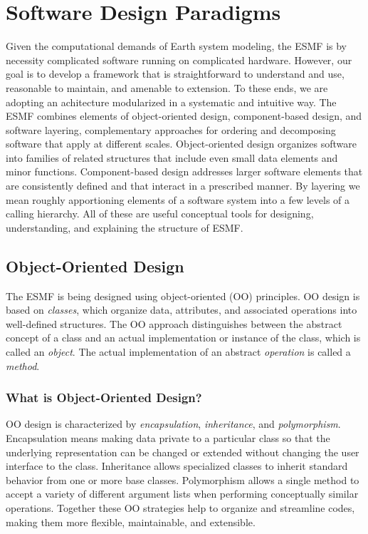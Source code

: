 \section{Software Design Paradigms}
\label{sec:strategies}

Given the computational demands of Earth system modeling, the ESMF is by 
necessity complicated software running on complicated hardware.  However,
our goal is to develop a framework that is straightforward to understand and 
use, reasonable to maintain, and amenable to extension.  
To these ends, we are adopting an achitecture modularized in a  
systematic and intuitive way.  The ESMF combines elements of 
object-oriented design, component-based design, and software layering, 
complementary approaches for ordering and decomposing software that apply
at different scales.  Object-oriented design organizes software into families 
of related structures that include even 
small data elements and minor functions.  Component-based design addresses 
larger software elements that are consistently defined and that interact
in a prescribed manner.  By layering we mean roughly apportioning elements 
of a software system into a few levels of a calling hierarchy.
All of these are useful conceptual tools for designing, understanding, and
explaining the structure of ESMF.

\subsection{Object-Oriented Design}
\label{sec:oop}

The ESMF is being designed using object-oriented (OO) principles.  OO design
is based on {\it classes}, which organize data, attributes, and associated 
operations into well-defined structures.  The OO approach distinguishes between 
the abstract concept of a class and an actual implementation or instance of the 
class, which is called an {\it object}.  The actual implementation of an 
abstract {\it operation} is called a {\it method}.

\subsubsection{What is Object-Oriented Design?}

OO design is characterized by {\it encapsulation}, {\it inheritance}, and 
{\it polymorphism}.  Encapsulation means making data 
private to a particular class so that the underlying representation
can be changed or extended without changing the user interface to the class.
Inheritance allows specialized classes to inherit standard behavior from one
or more base
classes.  Polymorphism allows a single method to accept a variety of 
different argument lists when performing conceptually similar operations.  
Together these OO strategies help to organize and streamline codes, making 
them more flexible, maintainable, and extensible.  


